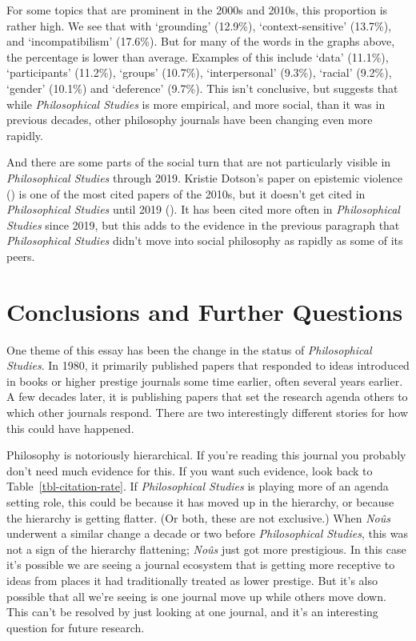 \documentclass[
  11pt,
  letterpaper,
  DIV=11,
  numbers=noendperiod,
  twoside]{scrartcl}
\begin{document}
For some topics that are prominent in the 2000s and 2010s, this
proportion is rather high. We see that with `grounding' (12.9\%),
`context-sensitive' (13.7\%), and `incompatibilism' (17.6\%). But for
many of the words in the graphs above, the percentage is lower than
average. Examples of this include `data' (11.1\%), `participants'
(11.2\%), `groups' (10.7\%), `interpersonal' (9.3\%), `racial' (9.2\%),
`gender' (10.1\%) and `deference' (9.7\%). This isn't conclusive, but
suggests that while \emph{Philosophical Studies} is more empirical, and
more social, than it was in previous decades, other philosophy journals
have been changing even more rapidly.

And there are some parts of the social turn that are not particularly
visible in \emph{Philosophical Studies} through 2019. Kristie Dotson's
paper on epistemic violence () is one of the most cited papers of the 2010s, but it doesn't get
cited in \emph{Philosophical Studies} until 2019
(). It has been cited
more often in \emph{Philosophical Studies} since 2019, but this adds to
the evidence in the previous paragraph that \emph{Philosophical Studies}
didn't move into social philosophy as rapidly as some of its peers.

\section{Conclusions and Further
Questions}\label{conclusions-and-further-questions}

One theme of this essay has been the change in the status of
\emph{Philosophical Studies}. In 1980, it primarily published papers
that responded to ideas introduced in books or higher prestige journals
some time earlier, often several years earlier. A few decades later, it
is publishing papers that set the research agenda others to which other
journals respond. There are two interestingly different stories for how
this could have happened.

Philosophy is notoriously hierarchical. If you're reading this journal
you probably don't need much evidence for this. If you want such
evidence, look back to Table~\ref{tbl-citation-rate}. If
\emph{Philosophical Studies} is playing more of an agenda setting role,
this could be because it has moved up in the hierarchy, or because the
hierarchy is getting flatter. (Or both, these are not exclusive.) When
\emph{Noûs} underwent a similar change a decade or two before
\emph{Philosophical Studies}, this was not a sign of the hierarchy
flattening; \emph{Noûs} just got more prestigious. In this case it's
possible we are seeing a journal ecosystem that is getting more
receptive to ideas from places it had traditionally treated as lower
prestige. But it's also possible that all we're seeing is one journal
move up while others move down. This can't be resolved by just looking
at one journal, and it's an interesting question for future research.
\end{document}
